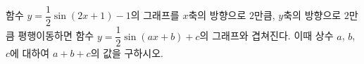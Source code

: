 함수 $y=\dfrac{1}{2}\sin(2x+1)-1$의 그래프를 $x$축의 방향으로 $2$만큼, $y$축의 방향으로 $2$만큼 평행이동하면 함수 $y=\dfrac{1}{2}\sin(ax+b)+c$의 그래프와 겹쳐진다. 이때 상수 $a$, $b$, $c$에 대하여 $a+b+c$의 값을 구하시오. 
